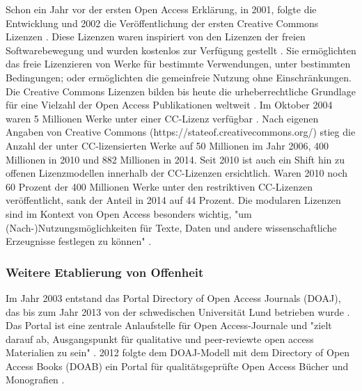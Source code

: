 Schon ein Jahr vor der ersten Open Access Erklärung, in 2001, folgte die Entwicklung und 2002 die Veröffentlichung der ersten Creative Commons Lizenzen \cite{garcia_2010_open}. Diese Lizenzen waren inspiriert von den Lizenzen der freien Softwarebewegung und wurden kostenlos zur Verfügung gestellt \cite{Minjeong_2007}. Sie ermöglichten das freie Lizenzieren von Werke für bestimmte Verwendungen, unter bestimmten Bedingungen; oder ermöglichten die gemeinfreie Nutzung ohne Einschränkungen. Die Creative Commons Lizenzen bilden bis heute die urheberrechtliche Grundlage für eine Vielzahl der Open Access Publikationen weltweit \cite{suchen}. Im Oktober 2004 waren 5 Millionen Werke unter einer CC-Lizenz verfügbar \cite{Suchen_Forbes_Movement_Seeks_Copyright_Alternatives}. Nach eigenen Angaben von Creative Commons (https://stateof.creativecommons.org/) stieg die Anzahl der unter CC-lizensierten Werke auf 50 Millionen im Jahr 2006, 400 Millionen in 2010 und 882 Millionen in 2014. Seit 2010 ist auch ein Shift hin zu offenen Lizenzmodellen innerhalb der CC-Lizenzen ersichtlich. Waren 2010 noch 60 Prozent der 400 Millionen Werke unter den restriktiven CC-Lizenzen veröffentlicht, sank der Anteil in 2014 auf 44 Prozent. Die modularen Lizenzen sind im Kontext von Open Access besonders wichtig, "um (Nach-)Nutzungsmöglichkeiten für Texte, Daten und andere wissenschaftliche Erzeugnisse festlegen zu können" \cite{suchen-Hoffmann-Zugang-undVerwertung-oeffentlicher-Informationen}.

\subsubsection{Weitere Etablierung von Offenheit}

Im Jahr 2003 entstand das Portal Directory of Open Access Journals (DOAJ), das bis zum Jahr 2013 von der schwedischen Universität Lund betrieben wurde \cite{doaj_2015_about}. Das Portal ist eine zentrale Anlaufstelle für Open Access-Journale \cite{suber_2015} und "zielt darauf ab, Ausgangspunkt für qualitative und peer-reviewte open access Materialien zu sein" \cite{doaj_2015_about}. 2012 folgte dem DOAJ-Modell mit dem Directory of Open Access Books (DOAB) ein Portal für qualitätsgeprüfte Open Access Bücher und Monografien \cite{adema_2013_political}.

